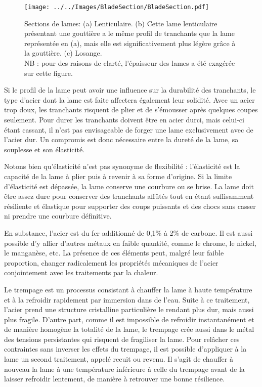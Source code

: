 \begin{figure}[ht]
\centering
	\texttt{[image: ../../Images/BladeSection/BladeSection.pdf]}
	\caption[Sections de lame]{Sections de lames: (a) Lenticulaire. (b) Cette lame lenticulaire présentant une gouttière a le même profil de tranchants que la lame représentée en (a), mais elle est significativement plus légère grâce à la gouttière. (c) Losange.\\
	NB : pour des raisons de clarté, l'épaisseur des lames a été exagérée sur cette figure.}
	\label{fig:blade_section}
\end{figure}

Si le profil de la lame peut avoir une influence sur la durabilité des tranchants, le type d'acier dont la lame est faite affectera également leur solidité.
Avec un acier trop doux, les tranchants risquent de plier et de s'émousser après quelques coupes seulement. Pour durer les tranchants doivent être en acier durci, mais celui-ci étant cassant, il n'est pas envisageable de forger une lame exclusivement avec de l'acier dur. 
Un compromis est donc nécessaire entre la dureté de la lame, sa souplesse et son élasticité.

Notons bien qu'élasticité n'est pas synonyme de flexibilité : l'élasticité est la capacité de la lame à plier puis à revenir à sa forme d'origine. Si la limite d'élasticité est dépassée, la lame conserve une courbure ou se brise.
La lame doit être assez dure pour conserver des tranchants affûtés tout en étant suffisamment résiliente et élastique pour supporter des coups puissants et des chocs sans casser ni prendre une courbure définitive. 

En substance, l'acier est du fer additionné de 0,1\% à 2\% de carbone.  Il est aussi possible d'y allier d'autres métaux en faible quantité, comme le chrome, le nickel, le manganèse, etc.
La présence de ces éléments peut, malgré leur faible proportion, changer radicalement les propriétés mécaniques de l'acier conjointement avec les traitements par la chaleur.

Le trempage est un processus consistant à chauffer la lame à haute température et à la refroidir rapidement par immersion dans de l'eau.
Suite à ce traitement, l'acier prend une structure cristalline particulière le rendant plus dur, mais aussi plus fragile.
D'autre part, comme il est impossible de refroidir instantanément et de manière homogène la totalité de la lame, le trempage crée aussi dans le métal des tensions persistantes qui risquent de fragiliser la lame.
Pour relâcher ces contraintes sans inverser les effets du trempage, il est possible d'appliquer à la lame un second traitement, appelé recuit ou revenu. Il s'agit de chauffer à nouveau la lame à une température inférieure à celle du trempage avant de la laisser refroidir lentement, de manière à retrouver une bonne résilience. 

